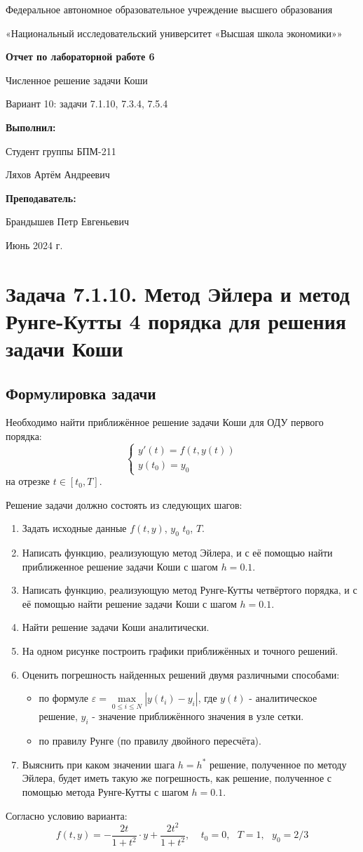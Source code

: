 \documentclass[12pt]{article}%
\date{}{Июнь 2024 г.}
\newcommand*{\Title}{\begingroup
\centering 

\large {Федеральное автономное образовательное учреждение высшего образования}
\vspace*{\baselineskip}

\large {«Национальный исследовательский университет «Высшая школа экономики»»}
\vspace*{\baselineskip}

\vspace*{\baselineskip}
\large{\textbf{Отчет по лабораторной работе 6}}

\vspace{0.1cm}
\large{Численное решение задачи Коши}

\vspace{0.2cm}
\large{Вариант 10: задачи 7.1.10, 7.3.4, 7.5.4}

\vspace{1.5cm} 

\begin{flushright}
  \textbf{\normalsize Выполнил:}
  
  \vspace{0.3cm} 
  {\normalsize Студент группы БПМ-211}
  
  {\normalsize Ляхов Артём Андреевич}

\end{flushright}


\vspace{0.2cm}  
\begin{flushright}
  \textbf{\normalsize Преподаватель:} 

  \vspace{0.2cm}

 {\normalsize Брандышев Петр Евгеньевич}
 
\end{flushright}

\vfill
\date{}{Июнь 2024 г.}


\endgroup\clearpage}
\begin{document}
\Title
\tableofcontents

\newpage
\section{Задача 7.1.10. Метод Эйлера и метод Рунге-Кутты 4 порядка для решения задачи Коши}
\subsection{Формулировка задачи}
Необходимо найти приближённое решение задачи Коши для ОДУ первого порядка:
$$
\begin{cases}
    y'(t) = f(t, y(t)) \\
    y(t_0) = y_0
\end{cases}
$$
на отрезке $t \in [t_0, T]$. 

Решение задачи должно состоять из следующих шагов:
\begin{enumerate}
    \item Задать исходные данные $f(t, y)$, $y_0$ $t_0$, $T$.
    \item Написать функцию, реализующую метод Эйлера, и с её помощью найти приближенное решение задачи Коши с шагом $h=0.1$.
    \item Написать функцию, реализующую метод Рунге-Кутты четвёртого порядка, и с её помощью найти решение задачи Коши с шагом $h=0.1$.
    \item Найти решение задачи Коши аналитически.
    \item На одном рисунке построить графики приближённых и точного решений.
    \item Оценить погрешность найденных решений двумя различными способами:
    \begin{itemize}
        \item по формуле $\varepsilon = \max\limits_{0 \leqslant i \leqslant N}|y(t_i) - y_i|$, где $y(t)$ - аналитическое решение, $y_i$ - значение приближённого значения в узле сетки.
        \item по правилу Рунге (по правилу двойного пересчёта).
    \end{itemize}
    \item Выяснить при каком значении шага $h = h^*$ решение, полученное по методу Эйлера, будет иметь такую же погрешность, как решение, полученное с помощью метода Рунге-Кутты с шагом $h=0.1$.
\end{enumerate}

Согласно условию варианта:
$$
f(t, y) = -\frac{2t}{1 + t^2} \cdot y + \frac{2t^2}{1 + t^2},\ \ \ \ \ t_0 = 0,\ \ \ T = 1,\ \ \ y_0 = 2/3
$$
\end{document}
